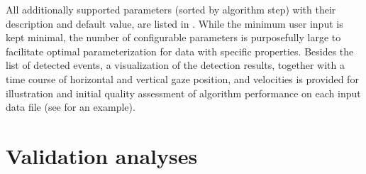 All additionally supported parameters (sorted by algorithm step) with their
description and default value, are listed in .
While the minimum user input is kept minimal, the number of configurable
parameters is purposefully large to facilitate optimal parameterization for
data with specific properties. Besides the list of detected events, a
visualization of the detection results, together with a time course of
horizontal and vertical gaze position, and velocities is provided for
illustration and initial quality assessment of algorithm performance on each
input data file (see  for an example).


\section*{Validation analyses}\label{ana}




